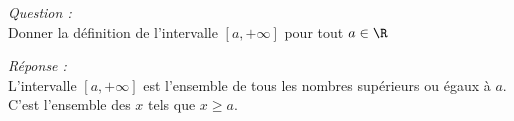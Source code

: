 \textit{Question : }\\

Donner la définition de l'intervalle $[a, + \infty]$ pour tout $a\in \R$

\textit{Réponse : }\\

L'intervalle $[a,+\infty]$ est l'ensemble de tous les nombres supérieurs ou égaux à $a$. C'est l'ensemble des $x$ tels que $x\geq a$.